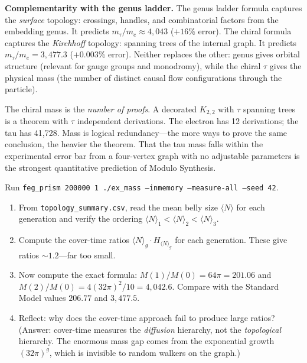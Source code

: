 \documentclass[11pt, a4paper, openany]{book}
\begin{document}
\noindent
\textbf{Complementarity with the genus ladder.}
The genus ladder formula captures the \emph{surface} topology:
crossings, handles, and combinatorial factors from the embedding genus.
It predicts $m_\tau/m_e \approx 4{,}043$ ($+16\%$ error).
The chiral formula captures the \emph{Kirchhoff} topology:
spanning trees of the internal graph.
It predicts $m_\tau/m_e = 3{,}477.3$ ($+0.003\%$ error).
Neither replaces the other: genus gives orbital structure
(relevant for gauge groups and monodromy), while the chiral
$\tau$ gives the physical mass (the number of distinct causal
flow configurations through the particle).

\begin{logicalreading}
The chiral mass is the \emph{number of proofs}.  A decorated $K_{2,2}$
with $\tau$ spanning trees is a theorem with $\tau$ independent
derivations.  The electron has 12 derivations; the tau has 41,728.
Mass is logical redundancy---the more ways to prove the same
conclusion, the heavier the theorem.  That the tau mass falls within
the experimental error bar from a four-vertex graph with no adjustable
parameters is the strongest quantitative prediction of Modulo Synthesis.
\end{logicalreading}

\begin{simulation}
Run \texttt{feg\_prism 200000 1 ./ex\_mass --inmemory --measure-all --seed 42}.
\begin{enumerate}
\item From \texttt{topology\_summary.csv}, read the mean belly size
  $\langle N \rangle$ for each generation and verify the ordering
  $\langle N \rangle_1 < \langle N \rangle_2 < \langle N \rangle_3$.
\item Compute the cover-time ratios
  $\langle N \rangle_g \cdot H_{\langle N \rangle_g}$ for each
  generation. These give ratios $\sim 1.2$---far too small.
\item Now compute the exact formula:
  $M(1)/M(0) = 64\pi = 201.06$ and
  $M(2)/M(0) = 4(32\pi)^2/10 = 4{,}042.6$. Compare with the
  Standard Model values $206.77$ and $3{,}477.5$.
\item Reflect: why does the cover-time approach fail to produce
  large ratios? (Answer: cover-time measures the \emph{diffusion}
  hierarchy, not the \emph{topological} hierarchy. The enormous
  mass gap comes from the exponential growth $(32\pi)^g$, which is
  invisible to random walkers on the graph.)
\end{enumerate}
\end{simulation}
\end{document}
